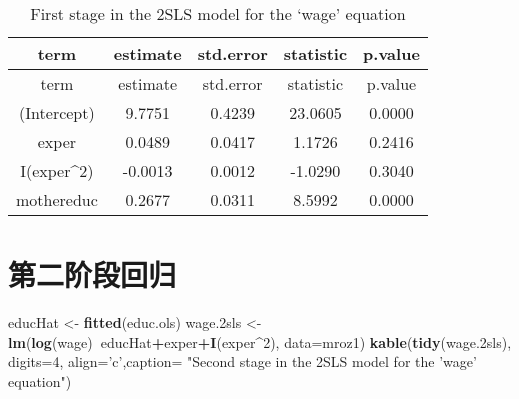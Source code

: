 \documentclass[
]{article}
\newenvironment{Shaded}{\begin{snugshade}}{\end{snugshade}}
\newcommand{\CommentTok}[1]{\textcolor[rgb]{0.56,0.35,0.01}{\textit{#1}}}
\newcommand{\DataTypeTok}[1]{\textcolor[rgb]{0.13,0.29,0.53}{#1}}
\newcommand{\DecValTok}[1]{\textcolor[rgb]{0.00,0.00,0.81}{#1}}
\newcommand{\FloatTok}[1]{\textcolor[rgb]{0.00,0.00,0.81}{#1}}
\newcommand{\KeywordTok}[1]{\textcolor[rgb]{0.13,0.29,0.53}{\textbf{#1}}}
\newcommand{\NormalTok}[1]{#1}
\newcommand{\OperatorTok}[1]{\textcolor[rgb]{0.81,0.36,0.00}{\textbf{#1}}}
\newcommand{\StringTok}[1]{\textcolor[rgb]{0.31,0.60,0.02}{#1}}
\begin{document}
\begin{Shaded}
\end{Shaded}

\begin{longtable}[]{@{}ccccc@{}}
\caption{First stage in the 2SLS model for the `wage'
equation}\tabularnewline
\toprule
term & estimate & std.error & statistic & p.value\tabularnewline
\midrule
\endfirsthead
\toprule
term & estimate & std.error & statistic & p.value\tabularnewline
\midrule
\endhead
(Intercept) & 9.7751 & 0.4239 & 23.0605 & 0.0000\tabularnewline
exper & 0.0489 & 0.0417 & 1.1726 & 0.2416\tabularnewline
I(exper\^{}2) & -0.0013 & 0.0012 & -1.0290 & 0.3040\tabularnewline
mothereduc & 0.2677 & 0.0311 & 8.5992 & 0.0000\tabularnewline
\bottomrule
\end{longtable}

\hypertarget{ux7b2cux4e8cux9636ux6bb5ux56deux5f52}{%
\section{第二阶段回归}\label{ux7b2cux4e8cux9636ux6bb5ux56deux5f52}}

\begin{Shaded}
\begin{Highlighting}[]
\NormalTok{educHat <-}\StringTok{ }\KeywordTok{fitted}\NormalTok{(educ.ols)}
\NormalTok{wage}\FloatTok{.2}\NormalTok{sls <-}\StringTok{ }\KeywordTok{lm}\NormalTok{(}\KeywordTok{log}\NormalTok{(wage)}\OperatorTok{~}\NormalTok{educHat}\OperatorTok{+}\NormalTok{exper}\OperatorTok{+}\KeywordTok{I}\NormalTok{(exper}\OperatorTok{^}\DecValTok{2}\NormalTok{), }\DataTypeTok{data=}\NormalTok{mroz1)}
\KeywordTok{kable}\NormalTok{(}\KeywordTok{tidy}\NormalTok{(wage}\FloatTok{.2}\NormalTok{sls), }\DataTypeTok{digits=}\DecValTok{4}\NormalTok{, }\DataTypeTok{align=}\StringTok{'c'}\NormalTok{,}\DataTypeTok{caption=}
  \StringTok{"Second stage in the 2SLS model for the 'wage' equation"}\NormalTok{)}
\end{Highlighting}
\end{Shaded}
\end{document}
